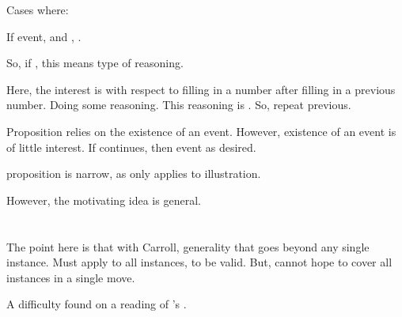 \begin{note}
  \begin{proposition}
    Cases where:

    If event, and \tR{}, \fc{}.
  \end{proposition}

  So, if \tR{}, this means type of reasoning.

  Here, the interest is with respect to filling in a number after filling in a previous number.
  Doing some reasoning.
  This reasoning is \tR{}.
  So, repeat previous.
\end{note}

\begin{note}
  Proposition relies on the existence of an event.
  However, existence of an event is of little interest.
  If continues, then event as desired.
\end{note}

\begin{note}
  proposition is narrow, as only applies to illustration.

  However, the motivating idea is general.
\end{note}

\section{\citeauthor{Carroll:1895uj}}

\nocite{Black:1951aa}

\begin{note}
  The point here is that with Carroll, generality that goes beyond any single instance.
  Must apply to all instances, to be valid.
  But, cannot hope to cover all instances in a single move.
\end{note}

\begin{note}
  A difficulty found on a reading of \citeauthor{Carroll:1895uj}'s .
\end{note}

